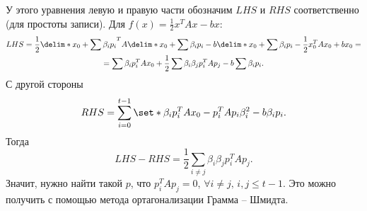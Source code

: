 У этого уравнения левую и правую части обозначим $LHS$ и $RHS$ соответственно (для простоты записи). Для $f(x) = \frac12 x^TAx - bx$:
\begin{multline*}
    LHS = \frac12\delim*{x_0 + \sum \beta_ip_i}^TA\delim*{x_0 + \sum \beta_ip_i} - b\delim*{x_0 + \sum \beta_ip_i} - \frac12x_0^TAx_0 + bx_0 = \\
    = \sum \beta_ip_i^TAx_0 + \frac12\sum \beta_i\beta_j p_i^TAp_j - b\sum \beta_ip_i.
\end{multline*}
С другой стороны
\begin{equation*}
    RHS = \sum_{i = 0}^{t - 1} \set*{\beta_ip_i^TAx_0 - p_i^TAp_i\beta_i^2 - b\beta_ip_i}.
\end{equation*}
Тогда
\begin{equation*}
    LHS - RHS = \frac12 \sum_{i \neq j} \beta_i\beta_j p_i^TAp_j.
\end{equation*}
Значит, нужно найти такой $p$, что $p_i^TAp_j = 0$, $\forall i \neq j,\, i, j \leq t - 1$. Это можно получить с помощью метода ортагонализации Грамма -- Шмидта. 

